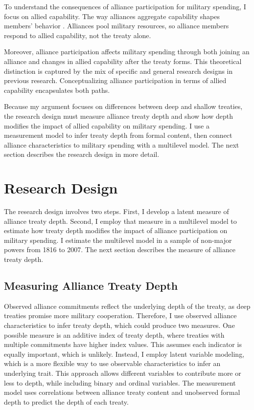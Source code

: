 \documentclass[12pt]{article}
\begin{document}
To understand the consequences of alliance participation for military spending, I focus on allied capability.
The way alliances aggregate capability shapes members' behavior \citep{FordhamPoast2014}. 
Alliances pool military resources, so alliance members respond to allied capability, not the treaty alone. 


Moreover, alliance participation affects military spending through both joining an alliance and changes in allied capability after the treaty forms. 
This theoretical distinction is captured by the mix of specific and general research designs in previous research. 
Conceptualizing alliance participation in terms of allied capability encapsulates both paths.  


Because my argument focuses on differences between deep and shallow treaties, the research design must measure alliance treaty depth and show how depth modifies the impact of allied capability on military spending.  
I use a measurement model to infer treaty depth from formal content, then connect alliance characteristics to military spending with a multilevel model. 
The next section describes the research design in more detail. 



\section*{Research Design} 


The research design involves two steps. 
First, I develop a latent measure of alliance treaty depth. 
Second, I employ that measure in a multilevel model to estimate how treaty depth modifies the impact of alliance participation on military spending. 
I estimate the multilevel model in a sample of non-major powers from 1816 to 2007. 
The next section describes the measure of alliance treaty depth. 


\subsection*{Measuring Alliance Treaty Depth} 


Observed alliance commitments reflect the underlying depth of the treaty, as deep treaties promise more military cooperation. 
Therefore, I use observed alliance characteristics to infer treaty depth, which could produce two measures. 
One possible measure is an additive index of treaty depth, where treaties with multiple commitments have higher index values. 
This assumes each indicator is equally important, which is unlikely. 
Instead, I employ latent variable modeling, which is a more flexible way to use observable characteristics to infer an underlying trait. 
This approach allows different variables to contribute more or less to depth, while including binary and ordinal variables.  
The measurement model uses correlations between alliance treaty content and unobserved formal depth to predict the depth of each treaty. 
\end{document}
